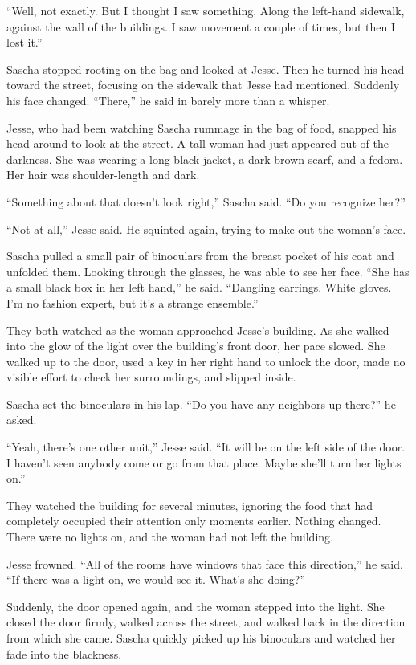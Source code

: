 \documentclass[12pt]{book}
\begin{document}
``Well, not exactly.  But I thought I saw something.  Along the left-hand sidewalk, against the wall of the buildings.  I saw movement a couple of times, but then I lost it.''

Sascha stopped rooting on the bag and looked at Jesse.  Then he turned his head toward the street, focusing on the sidewalk that Jesse had mentioned.  Suddenly his face changed.  ``There,'' he said in barely more than a whisper.

Jesse, who had been watching Sascha rummage in the bag of food, snapped his head around to look at the street.  A tall woman had just appeared out of the darkness.  She was wearing a long black jacket, a dark brown scarf, and a fedora.  Her hair was shoulder-length and dark.

``Something about that doesn't look right,'' Sascha said.  ``Do you recognize her?''

``Not at all,'' Jesse said.  He squinted again, trying to make out the woman's face.

Sascha pulled a small pair of binoculars from the breast pocket of his coat and unfolded them.  Looking through the glasses, he was able to see her face.  ``She has a small black box in her left hand,'' he said.  ``Dangling earrings.  White gloves.  I'm no fashion expert, but it's a strange ensemble.''

They both watched as the woman approached Jesse's building.  As she walked into the glow of the light over the building's front door, her pace slowed.  She walked up to the door, used a key in her right hand to unlock the door, made no visible effort to check her surroundings, and slipped inside.

Sascha set the binoculars in his lap.  ``Do you have any neighbors up there?'' he asked.

``Yeah, there's one other unit,'' Jesse said.  ``It will be on the left side of the door.  I haven't seen anybody come or go from that place.  Maybe she'll turn her lights on.''

They watched the building for several minutes, ignoring the food that had completely occupied their attention only moments earlier.  Nothing changed.  There were no lights on, and the woman had not left the building.

Jesse frowned.  ``All of the rooms have windows that face this direction,'' he said.  ``If there was a light on, we would see it.  What's she doing?''

Suddenly, the door opened again, and the woman stepped into the light.  She closed the door firmly, walked across the street, and walked back in the direction from which she came.  Sascha quickly picked up his binoculars and watched her fade into the blackness.
\end{document}
